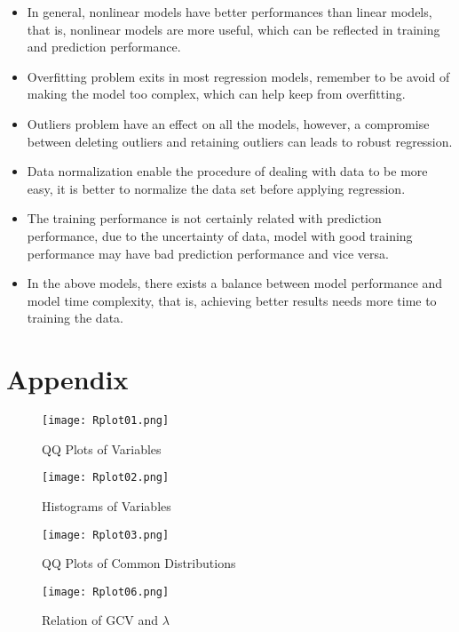 \documentclass[12pt,a4paper]{article}
\begin{document}
\begin{itemize}
	\item In general, nonlinear models have better performances than linear models, that is, nonlinear models are more useful, which can be reflected in training and prediction performance.
	\item Overfitting problem exits in most regression models, remember to be avoid of making the model too complex, which can help keep from overfitting.
	\item Outliers problem have an effect on all the models, however, a compromise between deleting outliers and retaining outliers can leads to robust regression.
    \item Data normalization enable the procedure of dealing with data to be more easy, it is better to normalize the data set before applying regression.
    \item The training performance is not certainly related with prediction performance, due to the uncertainty of data, model with good training performance may have bad prediction performance and vice versa.
    \item In the above models, there exists a balance between model performance and model time complexity, that is, achieving better results needs more time to training the data.
\end{itemize}

\newpage 
\appendix
\section{Appendix}
\begin{figure}[h]
	\centering
	\begin{minipage}[h]{0.48\textwidth}
		\centering
		\texttt{[image: Rplot01.png]}
		\caption{QQ Plots of Variables}
	\end{minipage}
	\begin{minipage}[h]{0.48\textwidth}
		\centering
		\texttt{[image: Rplot02.png]}
		\caption{Histograms of Variables}
	\end{minipage}                      
\end{figure}

\begin{figure}[h]
	\centering
	\begin{minipage}[h]{0.48\textwidth}
		\centering
		\texttt{[image: Rplot03.png]}
		\caption{QQ Plots of Common Distributions}
	\end{minipage}
	\begin{minipage}[h]{0.48\textwidth}
		\centering
		\texttt{[image: Rplot06.png]}
		\caption{Relation of GCV and $\lambda$}
	\end{minipage}                      
\end{figure}
\end{document}
